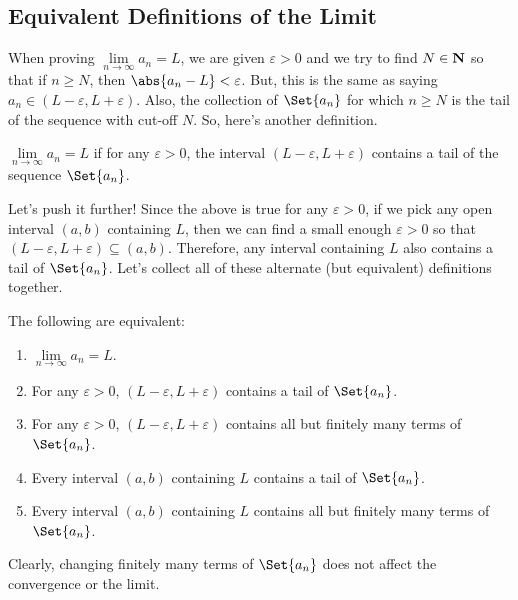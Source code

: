 \subsection{Equivalent Definitions of the Limit}
When proving $ \lim\limits_{{n} \to {\infty}}a_n=L $, we are given $ \varepsilon>0 $ and we try to find $ N\in\mathbf{N} $
so that if $ n\ge N $, then $ \abs{a_n-L}<\varepsilon $. But, this is the same as saying
$ a_n\in (L-\varepsilon,L+\varepsilon) $. Also, the collection of $ \Set{a_n} $ for which
$ n\ge N $ is the tail of the sequence with cut-off $ N $. So, here's another definition.
\begin{Definition}{}{}
    $ \lim\limits_{{n} \to {\infty}}a_n=L $ if for any $ \varepsilon>0 $, the interval
    $ (L-\varepsilon,L+\varepsilon) $ contains a tail of the sequence $ \Set{a_n} $.
\end{Definition}
Let's push it further! Since the above is true for any $ \varepsilon>0 $, if we pick any
open interval $ (a,b) $ containing $ L $, then we can find a small enough $ \varepsilon>0 $
so that $ (L-\varepsilon,L+\varepsilon)\subseteq (a,b) $. Therefore, any interval containing
$ L $ also contains a tail of $ \Set{a_n} $. Let's collect all of these alternate (but equivalent) definitions together.
\begin{Theorem}{}{}
    The following are equivalent:
    \begin{enumerate}[(1)]
        \item $ \lim\limits_{{n} \to {\infty}}a_n=L $.
        \item For any $ \varepsilon>0 $, $ (L-\varepsilon,L+\varepsilon) $ contains a tail of $ \Set{a_n} $.
        \item For any $ \varepsilon>0 $, $ (L-\varepsilon,L+\varepsilon) $ contains all but finitely many terms of $ \Set{a_n} $.
        \item Every interval $ (a,b) $ containing $ L $ contains a tail of $ \Set{a_n} $.
        \item Every interval $ (a,b) $ containing $ L $ contains all but finitely many terms of $ \Set{a_n} $.
    \end{enumerate}
    Clearly, changing finitely many terms of $ \Set{a_n} $ does not affect the convergence or the limit.
\end{Theorem}
